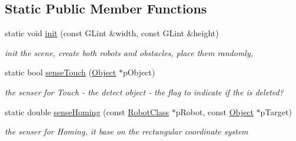 \subsection*{Static Public Member Functions}
\begin{DoxyCompactItemize}
\item 
static void \hyperlink{classEnvironmentClass_a3af1904397a45c74acbc0c8246c0317d}{init} (const G\-Lint \&width, const G\-Lint \&height)
\begin{DoxyCompactList}\small\item\em init the scene, create both robots and obstacles, place them randomly, \end{DoxyCompactList}\item 
static bool \hyperlink{classEnvironmentClass_a52f4e00b563733c2019204d16de139b9}{sense\-Touch} (\hyperlink{classObject}{Object} $\ast$p\-Object)
\begin{DoxyCompactList}\small\item\em the senser for {\itshape Touch}  -\/ the detect object  -\/ the flag to indicate if the  is deleted? \end{DoxyCompactList}\item 
static double \hyperlink{classEnvironmentClass_a5b501f7123ca5ba7fd711a44a3d0141e}{sense\-Homing} (const \hyperlink{classRobotClass}{Robot\-Class} $\ast$p\-Robot, const \hyperlink{classObject}{Object} $\ast$p\-Target)
\begin{DoxyCompactList}\small\item\em the senser for {\itshape Homing}, it base on the rectangular coordinate system \end{DoxyCompactList}\end{DoxyCompactItemize}
